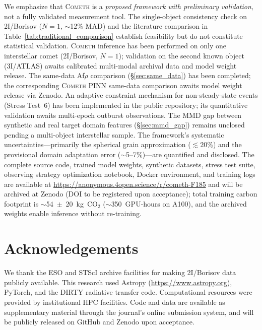 \documentclass[usenatbib]{mnras}
\begin{document}
We emphasize that \textsc{Cometh} is a \textit{proposed framework with preliminary validation}, not a fully validated measurement tool. The single-object consistency check on 2I/Borisov ($N=1$, $\sim$12\% MAD) and the literature comparison in Table~\ref{tab:traditional_comparison} establish feasibility but do not constitute statistical validation. \textsc{Cometh} inference has been performed on only one interstellar comet (2I/Borisov, $N=1$); validation on the second known object (3I/ATLAS) awaits calibrated multi-modal archival data and model weight release. The same-data Af$\rho$ comparison (\S\ref{sec:same_data}) has been completed; the corresponding \textsc{Cometh} PINN same-data comparison awaits model weight release via Zenodo. An adaptive constraint mechanism for non-steady-state events (Stress Test~6) has been implemented in the public repository; its quantitative validation awaits multi-epoch outburst observations. The MMD gap between synthetic and real target domain features (\S\ref{sec:mmd_gap}) remains unclosed pending a multi-object interstellar sample. The framework's systematic uncertainties---primarily the spherical grain approximation ($\lesssim 20\%$) and the provisional domain adaptation error ($\sim$5--7\%)---are quantified and disclosed. The complete source code, trained model weights, synthetic datasets, stress test suite, observing strategy optimization notebook, Docker environment, and training logs are available at \url{https://anonymous.4open.science/r/cometh-F185} and will be archived at Zenodo (DOI to be registered upon acceptance); total training carbon footprint is $\sim$54~$\pm$~20~kg~CO$_2$ ($\sim$350~GPU-hours on A100), and the archived weights enable inference without re-training.

\section*{Acknowledgements}
We thank the ESO and STScI archive facilities for making 2I/Borisov data publicly available. This research used Astropy (\url{https://www.astropy.org}), PyTorch, and the DIRTY radiative transfer code. Computational resources were provided by institutional HPC facilities. Code and data are available as supplementary material through the journal's online submission system, and will be publicly released on GitHub and Zenodo upon acceptance.
\end{document}
